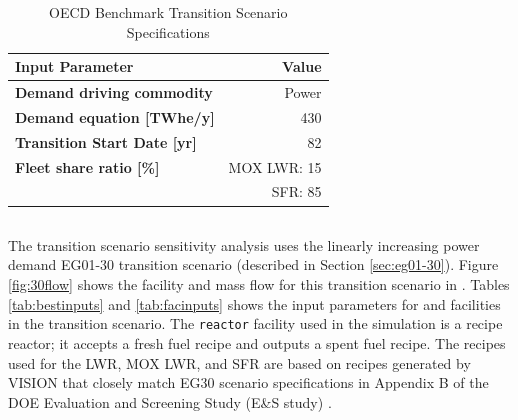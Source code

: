 \begin{table}[]
    \centering
    \doublespacing
    \caption{OECD Benchmark Transition Scenario
	Specifications \cite{oecd_nuclear_energy_agency_wpfc_nodate}}
	\label{tab:dymondinputs}
    \small
    \begin{tabular}{lr}
    \hline
                               \textbf{Input Parameter}            & \textbf{Value}            \\ \hline
    \textbf{Demand driving commodity}   & Power              \\
    \textbf{Demand equation {[}TWhe/y{]}}   & 430        \\
    \textbf{Transition Start Date [yr]} & 82\\ 
    \textbf{Fleet share ratio [\%]} & \gls{MOX} LWR: 15 \\ & \gls{SFR}: 85\\ \hline
    \end{tabular}%
    \end{table}

\subsection{\Cyclus}
The \Cyclus transition scenario sensitivity analysis uses 
the linearly increasing power demand EG01-30 transition scenario 
(described in Section \ref{sec:eg01-30}).  
Figure \ref{fig:30flow} shows the facility and mass flow 
for this transition scenario in \Cyclus. 
Tables \ref{tab:bestinputs} and \ref{tab:facinputs}
shows the input parameters for \deploy and facilities
in the transition scenario. 
The \texttt{reactor} facility used in the \Cyclus simulation 
is a recipe reactor; it accepts a fresh fuel recipe and outputs 
a spent fuel recipe. 
The recipes used for the \gls{LWR}, \gls{MOX} \gls{LWR}, and 
\gls{SFR} are based on recipes generated by VISION 
\cite{chee_arfc/transition-scenarios_2018}
that closely match EG30 scenario specifications in 
Appendix B of the \gls{DOE} Evaluation and Screening Study 
(E\&S study) \cite{wigeland_nuclear_2014}. 

